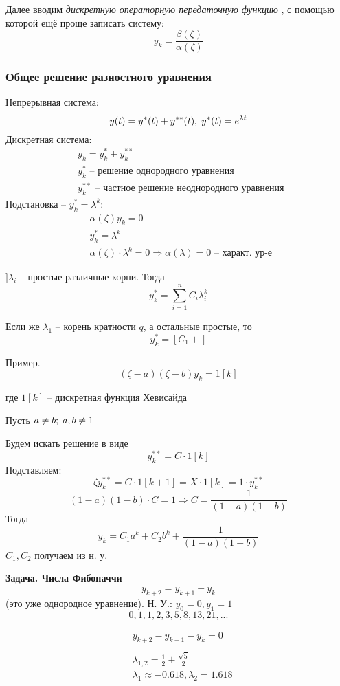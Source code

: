 \documentclass[main.tex]{subfiles}
\begin{document}
Далее вводим \emph{ дискретную операторную передаточную функцию }, с помощью которой ещё проще записать систему:
\[ y_k = \frac{\beta(\zeta)}{\alpha(\zeta)} \]

\subsubsection{ Общее решение разностного уравнения }

Непрерывная система:
\[ y(t) = y^*(t) + y^{**}(t), \thickspace y^*(t) = e^{\lambda t} \]
Дискретная система:
\begin{align*}
	& y_k = y_k^* + y_k^{**} \\
	& y_k^* \text{ -- решение однородного уравнения } \\
	& y_k^{**} \text{ -- частное решение неоднородного уравнения }
\end{align*}
Подстановка -- $ y_k^* = \lambda^k $:
\begin{align*}
	& \alpha(\zeta) y_k = 0 \\
	& y_k^* = \lambda^k \\
	& \alpha(\zeta) \cdot \lambda^k = 0 \Rightarrow \boxed{ \alpha(\lambda) = 0 } \text{ -- характ. ур-е }
\end{align*}

$ ] \lambda_i $ -- простые различные корни.
Тогда
\[ \boxed{ y_k^* = \sum_{i=1}^{n} C_i \lambda_i^k } \]

Если же $ \lambda_1 $ -- корень кратности $ q $, а остальные простые, то
\[ y_k^* = [C_1 + ] \] %

Пример.
\[ (\zeta - a)(\zeta - b) y_k = 1[k] \]

где $1[k]$ -- дискретная функция Хевисайда

Пусть $ a \ne b; \thickspace a,b \ne 1 $

Будем искать решение в виде
\[ y_k^{**} = C \cdot 1[k] \]
Подставляем:
\[ \zeta y_k^{**} = C \cdot 1[k + 1] = X \cdot 1[k] = 1 \cdot y_k^{**} \]
\[ (1-a)(1-b) \cdot C = 1 \Rightarrow C = \frac{1}{(1-a)(1-b)} \]
Тогда
\[ y_k = C_1 a^k + C_2 b^k + \frac{ 1 }{(1-a)(1-b)} \]
$ C_1, C_2 $ получаем из н. у.

\textbf{ Задача. Числа Фибоначчи }
\[ y_{k+2} = y_{k+1} + y_k \]
(это уже однородное уравнение).
Н. У.: $ y_0 = 0, y_1 = 1 $
\[ 0, 1, 1, 2, 3, 5, 8, 13, 21, ... \]

\begin{align*}
	& y_{k+2} - y_{k+1} - y_k = 0 \\
	& \\ %
	& \lambda_{1,2} = \frac{1}{2} \pm \frac{\sqrt{5}}{2} \\
	& \lambda_1 \approx - 0.618, \lambda_2 = 1.618 \\
	& \\ %
\end{align*}
\end{document}
